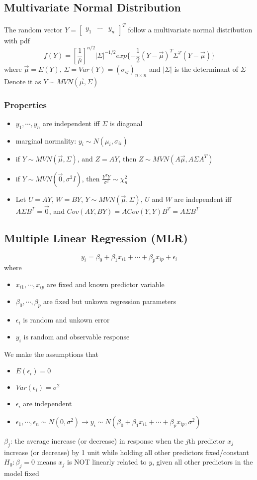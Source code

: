 \documentclass[11pt]{article}
\newcommand{\cv}[1]{\begin{bmatrix} #1 \end{bmatrix}}
\begin{document}
\subsection{Multivariate Normal Distribution}
The random vector $Y=\cv{y_1&\cdots&y_n}^T$ follow a multivariate normal distribution with pdf 
\[f(Y)=[\frac{1}{\overline{\mu}}]^{n/2}|\Sigma|^{-1/2}exp\{-\frac{1}{2}(Y-\vec{\mu})^T\Sigma^T(Y-\vec{\mu})\}\]
where $\vec{\mu}=E(Y)$, $\Sigma=Var(Y)=(\sigma_{ij})_{n\times n}$ and $|\Sigma|$ is the determinant of $\Sigma$ \\
Denote it as $Y\sim MVN(\vec{\mu}, \Sigma)$
\subsubsection{Properties}
\begin{itemize}
    \item $y_1,\cdots,y_n$ are independent iff $\Sigma$ is diagonal 
    \item marginal normality: $y_i\sim N(\mu_i,\sigma_{ii})$
    \item if $Y\sim MVN(\vec{\mu},\Sigma)$, and $Z=AY$, then $Z\sim MVN(A\vec{\mu}, A\Sigma A^T)$
    \item if $Y\sim MVN(\vec{0},\sigma^2I)$, then $\frac{Y^TY}{\sigma^2}\sim \chi^2_n$
    \item Let $U=AY$, $W=BY$, $Y\sim MVN(\vec{\mu},\Sigma)$, $U$ and $W$ are independent iff $A\Sigma B^T=\vec{0}$, and $Cov(AY,BY)=ACov(Y,Y)B^T=A\Sigma B^T$
\end{itemize}
\subsection{Multiple Linear Regression (MLR)}
\[y_i=\beta_0+\beta_1x_{i1}+\cdots+\beta_px_{ip}+\epsilon_i\]
where 
\begin{itemize}
    \item $x_{i1},\cdots,x_{ip}$ are fixed and known predictor variable 
    \item $\beta_0,\cdots,\beta_p$ are fixed but unkown regression parameters 
    \item $\epsilon_i$ is random and unkown error 
    \item $y_i$ is random and observable response 
\end{itemize}
We make the assumptions that 
\begin{itemize}
    \item $E(\epsilon_i)=0$
    \item $Var(\epsilon_i)=\sigma^2$
    \item $\epsilon_i$ are independent
    \item $\epsilon_1,\cdots,\epsilon_n\sim N(0,\sigma^2)\rightarrow y_i\sim N(\beta_0+\beta_1x_{i1}+\cdots+\beta_px_{ip}, \sigma^2)$
\end{itemize}
$\beta_j$: the average increase (or decrease) in response when the $j$th predictor $x_j$ increase (or decrease) by 1 unit while holding all other predictors fixed/constant \\
$H_0:\beta_j=0$ means $x_j$ is NOT linearly related to $y$, given all other predictors in the model fixed 
\end{document}
